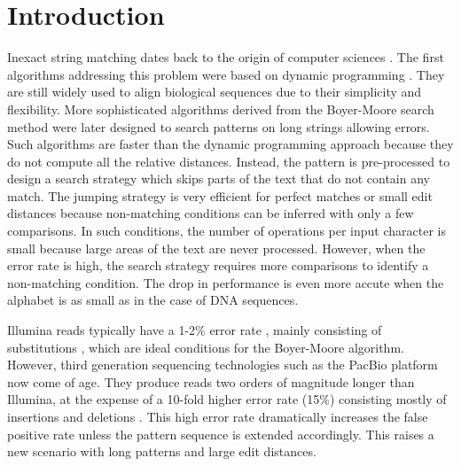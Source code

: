 \documentclass{bioinfo}
\begin{document}
\section{Introduction}

Inexact string matching dates back to the origin of computer sciences
\citep{Lev65}. The first algorithms addressing this problem were based
on dynamic programming \citep{NW70}. They are still widely used to
align biological sequences due to their simplicity and flexibility.
More sophisticated algorithms derived from the Boyer-Moore search
method \citep{BM77} were later designed to search patterns on long
strings allowing errors. Such algorithms are faster than the dynamic
programming approach because they do not compute all the relative
distances. Instead, the pattern is pre-processed to design a search
strategy which skips parts of the text that do not contain any
match. The jumping strategy is very efficient for perfect matches or
small edit distances because non-matching conditions can be inferred
with only a few comparisons. In such conditions, the number of
operations per input character is small because large areas of the
text are never processed. However, when the error rate is high, the
search strategy requires more comparisons to identify a non-matching
condition. The drop in performance is even more accute when the alphabet
is as small as in the case of DNA sequences.

Illumina reads typically have a 1-2\% error rate \citep{Mar05},
mainly consisting of substitutions \citep{Doh08}, which are ideal
conditions for the Boyer-Moore algorithm. However, third generation
sequencing technologies such as the PacBio platform now come of age.
They produce reads two orders of magnitude longer than Illumina, at
the expense of a 10-fold higher error rate (15\%) consisting mostly
of insertions and deletions \citep{Eid09}.  
This high error rate dramatically increases the false
positive rate unless the pattern sequence is extended
accordingly. This raises a new scenario with long patterns and
large edit distances.
\end{document}
